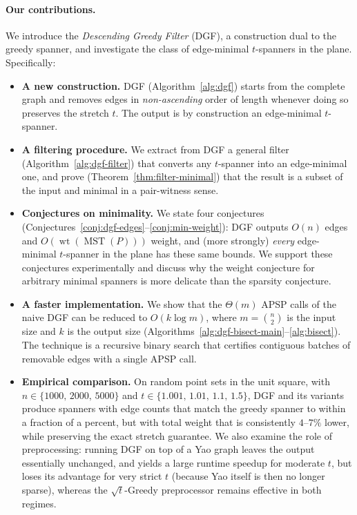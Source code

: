 \documentclass{article}
\DeclareMathOperator{\wt}{wt}
\DeclareMathOperator{\MST}{MST}
\begin{document}
\paragraph{Our contributions.}
We introduce the \emph{Descending Greedy Filter} (DGF), a construction
dual to the greedy spanner, and investigate the class of edge-minimal
$t$-spanners in the plane. Specifically:
\begin{itemize}
  \item \textbf{A new construction.} DGF (Algorithm~\ref{alg:dgf})
    starts from the complete graph and removes edges in
    \emph{non-ascending} order of length whenever doing so preserves
    the stretch $t$. The output is by construction an edge-minimal
    $t$-spanner.
  \item \textbf{A filtering procedure.} We extract from DGF a general
    filter (Algorithm~\ref{alg:dgf-filter}) that converts any
    $t$-spanner into an edge-minimal one, and prove
    (Theorem~\ref{thm:filter-minimal}) that the result is a subset of
    the input and minimal in a pair-witness sense.
  \item \textbf{Conjectures on minimality.} We state four conjectures
    (Conjectures~\ref{conj:dgf-edges}--\ref{conj:min-weight}): DGF
    outputs $O(n)$ edges and $O(\wt(\MST(P)))$ weight, and (more
    strongly) \emph{every} edge-minimal $t$-spanner in the plane has
    these same bounds. We support these conjectures experimentally and
    discuss why the weight conjecture for arbitrary minimal spanners
    is more delicate than the sparsity conjecture.
  \item \textbf{A faster implementation.} We show that the $\Theta(m)$
    APSP calls of the naive DGF can be reduced to $O(k\log m)$, where
    $m=\binom{n}{2}$ is the input size and $k$ is the output size
    (Algorithms~\ref{alg:dgf-bisect-main}--\ref{alg:bisect}). The
    technique is a recursive binary search that certifies contiguous
    batches of removable edges with a single APSP call.
  \item \textbf{Empirical comparison.} On random point sets in the
    unit square, with $n\in\{1000,\,2000,\,5000\}$ and
    $t\in\{1.001,\,1.01,\,1.1,\,1.5\}$, DGF and its variants produce
    spanners with edge counts that match the greedy spanner to
    within a fraction of a percent, but with total weight that is
    consistently $4$--$7\%$ lower, while preserving the exact stretch
    guarantee. We also examine the role of preprocessing: running DGF
    on top of a Yao graph leaves the output essentially unchanged, and
    yields a large runtime speedup for moderate $t$, but loses its
    advantage for very strict $t$ (because Yao itself is then no
    longer sparse), whereas the $\sqrt{t}$-Greedy preprocessor remains
    effective in both regimes.
\end{itemize}
\end{document}
